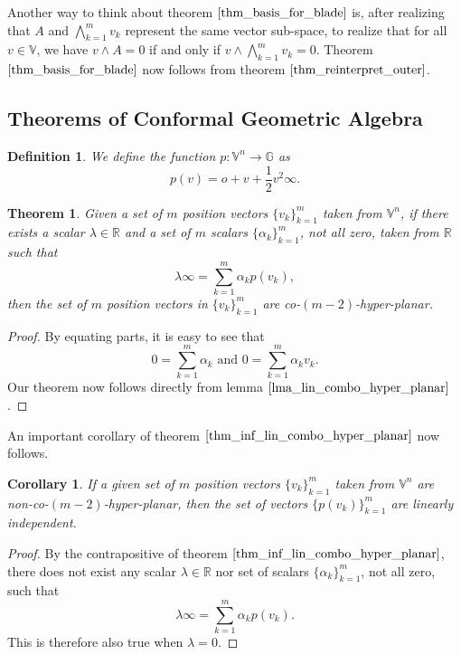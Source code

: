 \documentclass{article}
\newcommand{\R}{\mathbb{R}}
\newcommand{\V}{\mathbb{V}}
\newcommand{\G}{\mathbb{G}}
\newcommand{\nvao}{o}
\newcommand{\nvai}{\infty}
\newtheorem{theorem}{Theorem}[section]
\newtheorem{definition}{Definition}[section]
\newtheorem{corollary}{Corollary}[section]
\begin{document}
Another way to think about theorem $\eqref{thm_basis_for_blade}$ is, after
realizing that $A$ and $\bigwedge_{k=1}^m v_k$ represent the same vector sub-space,
to realize that for all $v\in\V$, we have $v\wedge A=0$ if and only if
$v\wedge\bigwedge_{k=1}^m v_k=0$.  Theorem $\eqref{thm_basis_for_blade}$ now follows from
theorem $\eqref{thm_reinterpret_outer}$.

\subsection{Theorems of Conformal Geometric Algebra}\label{thms_of_conf_geo_alg}

\begin{definition}
We define the function $p:\V^n\to\G$ as
\begin{equation*}
p(v) = \nvao + v + \frac{1}{2}v^2\nvai.
\end{equation*}
\end{definition}

\begin{theorem}\label{thm_inf_lin_combo_hyper_planar}
Given a set of $m$ position vectors $\{v_k\}_{k=1}^m$ taken from $\V^n$,
if there exists a scalar $\lambda\in\R$ and a set of $m$ scalars
$\{\alpha_k\}_{k=1}^m$, not all zero, taken from $\R$ such that
\begin{equation*}
\lambda\nvai = \sum_{k=1}^m\alpha_k p(v_k),
\end{equation*}
then the set of $m$ position vectors in $\{v_k\}_{k=1}^m$ are co-$(m-2)$-hyper-planar.
\end{theorem}
\begin{proof}
By equating parts, it is easy to see that
\begin{equation*}
\mbox{$0 = \sum_{k=1}^m\alpha_k$ and $0=\sum_{k=1}^m\alpha_k v_k$.}
\end{equation*}
Our theorem now follows directly from lemma $\eqref{lma_lin_combo_hyper_planar}$.
\end{proof}

An important corollary of theorem $\eqref{thm_inf_lin_combo_hyper_planar}$ now follows.

\begin{corollary}\label{cor_non_hyper_planar_lin_indep}
If a given set of $m$ position vectors $\{v_k\}_{k=1}^m$ taken from $\V^n$
are non-co-$(m-2)$-hyper-planar, then the set of vectors $\{p(v_k)\}_{k=1}^m$
are linearly independent.
\end{corollary}
\begin{proof}
By the contrapositive of theorem $\eqref{thm_inf_lin_combo_hyper_planar}$,
there does not exist any scalar $\lambda\in\R$ nor set of scalars
$\{\alpha_k\}_{k=1}^m$, not all zero, such that
\begin{equation*}
\lambda\nvai = \sum_{k=1}^m\alpha_k p(v_k).
\end{equation*}
This is therefore also true when $\lambda=0$.
\end{proof}
\end{document}
